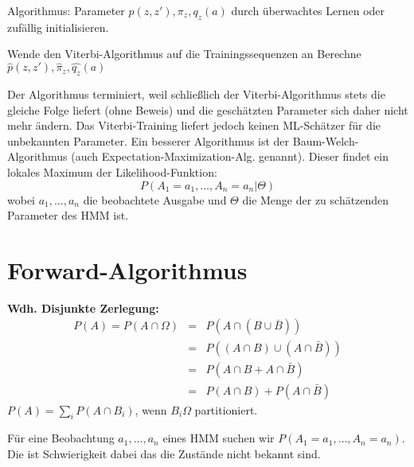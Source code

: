 Algorithmus: Parameter \(p(z,z'), \pi_z, q_z(a)\) durch überwachtes Lernen oder zufällig initialisieren.

\begin{algorithmic}[1]
	\Repeat
	\State Wende den Viterbi-Algorithmus auf die Trainingssequenzen an
	\State Berechne \(\hat{p}(z,z'), \hat\pi_z, \hat{q_z}(a)\)
\end{algorithmic}
Der Algorithmus terminiert, weil schließlich der Viterbi-Algorithmus stets  die gleiche Folge liefert (ohne Beweis) und die geschätzten Parameter sich daher nicht mehr ändern.
Das Viterbi-Training liefert jedoch keinen ML-Schätzer für die unbekannten Parameter.
Ein besserer Algorithmus ist der Baum-Welch-Algorithmus (auch Expect\-ation-Max\-i\-mization-Alg. genannt).
Dieser findet ein lokales Maximum der Likelihood-Funktion:
	\[P(A_1=a_1, \dots, A_n=a_n|\Theta)\]
wobei \(a_1, \dots, a_n\) die beobachtete Ausgabe und \(\Theta\) die Menge der zu schätzenden Parameter des HMM ist.


\section{Forward-Algorithmus}
\begin{shaded}
	\noindent
	\textbf{Wdh. Disjunkte Zerlegung:}
	\begin{eqnarray*}
		P(A) = P(A \cap \Omega) &=& P(A \cap (B \cup \bar{B}))\\
								&=& P((A \cap B) \cup (A \cap \bar{B}))\\
								&=& P(A \cap B + A \cap \bar{B})\\
								&=& P(A \cap B)+P(A \cap \bar{B})
	\end{eqnarray*}
	\(P(A) = \sum_i P(A \cap B_i)\), wenn \(B_i \Omega\) partitioniert.
	\begin{center}
	\end{center}
\end{shaded}
Für eine Beobachtung \(a_1, \dots, a_n\) eines HMM suchen wir \(P(A_1=a_1, \dots, A_n=a_n)\).
Die ist Schwierigkeit dabei das die Zustände nicht bekannt sind.


